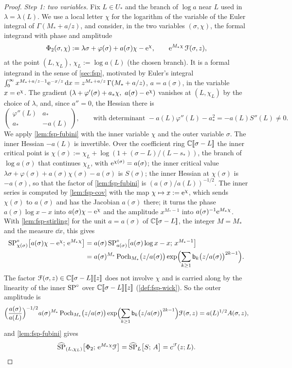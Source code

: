 \begin{proof}
\emph{Step 1: two variables.} Fix $L\in U_*$ and the branch of $\log a$ near $L$ used in $\lambda=\lambda(L)$. We use a local letter $\chi$ for the logarithm of the variable of the Euler integral of $\Gamma(M_*+a/z)$, and consider, in the two variables $(\sigma,\chi)$, the formal integrand with phase and amplitude
\[
\Phi_2(\sigma,\chi):=\lambda\sigma+\varphi(\sigma)+a(\sigma)\chi-\mathrm{e}^{\chi},\qquad \mathrm{e}^{M_*\chi}\,\mathcal{F}(\sigma,z),
\]
at the point $(L,\chi_L)$, $\chi_L:=\log a(L)$ (the chosen branch). It is a formal integrand in the sense of \cref{sec:fsp}, motivated by Euler's integral $\int_0^\infty x^{M_*+a/z-1}\mathrm{e}^{-x/z}\,\mathrm{d} x=z^{M_*+a/z}\,\Gamma(M_*+a/z)$, $a=a(\sigma)$, in the variable $x=\mathrm{e}^\chi$. The gradient $(\lambda+\varphi'(\sigma)+a_*\chi,\ a(\sigma)-\re^{\chi})$ vanishes at $(L,\chi_L)$ by the choice of $\lambda$, and, since $a''=0$, the Hessian there is
\[
\begin{pmatrix}\varphi''(L)&a_*\\ a_*&-a(L)\end{pmatrix},\qquad\text{with determinant }-a(L)\varphi''(L)-a_*^2=-a(L)S''(L)\neq 0.
\]
We apply \cref{lem:fsp-fubini} with the inner variable $\chi$ and the outer variable $\sigma$. The inner Hessian $-a(L)$ is invertible. Over the coefficient ring $\mathbb{C}[\![ \sigma-L ]\!]$ the inner critical point is $\chi(\sigma):=\chi_L+\log(1+(\sigma-L)/(L-s_*))$, the branch of $\log a(\sigma)$ that continues $\chi_L$, with $\mathrm{e}^{\chi(\sigma)}=a(\sigma)$; the inner critical value $\lambda\sigma+\varphi(\sigma)+a(\sigma)\chi(\sigma)-a(\sigma)$ is $S(\sigma)$; the inner Hessian at $\chi(\sigma)$ is $-a(\sigma)$, so that the factor of \cref{lem:fsp-fubini} is $(a(\sigma)/a(L))^{-1/2}$. The inner series is computed by \cref{lem:fsp-cov} with the map $\chi\mapsto x:=\mathrm{e}^{\chi}$, which sends $\chi(\sigma)$ to $a(\sigma)$ and has the Jacobian $a(\sigma)$ there; it turns the phase $a(\sigma)\log x-x$ into $a(\sigma)\chi-\mathrm{e}^{\chi}$ and the amplitude $x^{M_*-1}$ into $a(\sigma)^{-1}\mathrm{e}^{M_*\chi}$. With \cref{lem:fsp-stirling} for the unit $a=a(\sigma)$ of $\mathbb{C}[\![ \sigma-L ]\!]$, the integer $M=M_*$ and the measure $\dd x$, this gives
\begin{align*}
\mathrm{SP}^{\circ}_{\chi(\sigma)}\bigl[a(\sigma)\chi-\mathrm{e}^{\chi};\,\mathrm{e}^{M_*\chi}\bigr]&=a(\sigma)\,\mathrm{SP}^{\circ}_{a(\sigma)}\bigl[a(\sigma)\log x-x;\,x^{M_*-1}\bigr]\\
&=a(\sigma)^{M_*}\,\mathrm{Poch}_{M_*}\bigl(z/a(\sigma)\bigr)\exp\Bigl(\sum_{k\geq 1}\mathsf{b}_k\bigl(z/a(\sigma)\bigr)^{2k-1}\Bigr).
\end{align*}
The factor $\mathcal{F}(\sigma,z)\in\mathbb{C}[\![ \sigma-L ]\!][\![ z ]\!]$ does not involve $\chi$ and is carried along by the linearity of the inner $\mathrm{SP}^{\circ}$ over $\mathbb{C}[\![ \sigma-L ]\!][\![ z ]\!]$ (\cref{def:fsp-wick}). So the outer amplitude is
\[
\Bigl(\frac{a(\sigma)}{a(L)}\Bigr)^{-1/2}a(\sigma)^{M_*}\,\mathrm{Poch}_{M_*}\bigl(z/a(\sigma)\bigr)\exp\Bigl(\sum_{k\geq1}\mathsf{b}_k\bigl(z/a(\sigma)\bigr)^{2k-1}\Bigr)\mathcal{F}(\sigma,z)=a(L)^{1/2}A(\sigma,z),
\]
and \cref{lem:fsp-fubini} gives
\begin{equation}
\label{eq:gam-step1}
\widehat{\mathrm{SP}}_{(L,\chi_L)}\bigl[\Phi_2;\,\mathrm{e}^{M_*\chi}\mathcal{F}\bigr]=\widehat{\mathrm{SP}}_L\bigl[S;\,A\bigr]=c^{\mathcal{F}}(z;L).
\end{equation}


\end{proof}
